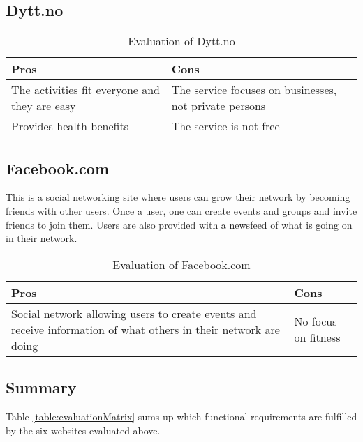 \subsection{Dytt.no}
\begin{table}[H]
\begin{center}
\begin{tabu} to 0.8\textwidth{ |X[l]|X[l]| } 
\hline {}
Pros & Cons \\
\hline
The activities fit everyone and they are easy &
The service focuses on businesses, not private persons \\ 
\hline
Provides health benefits & The service is not free \\ 
\hline
\end{tabu}
\end{center}
\caption{Evaluation of Dytt.no}
\end{table}

\subsection{Facebook.com}
This is a social networking site where users can grow their network by becoming friends with other users. Once a user, one can create events and groups and invite friends to join them. Users are also provided with a newsfeed of what is going on in their network. 
\begin{table}[H]
\begin{center}
\begin{tabu} to 0.8\textwidth{ |X[l]|X[l]| } 
\hline {}
Pros & Cons \\
\hline
Social network allowing users to create events and receive information of what others in their network are doing &
No focus on fitness \\ 
\hline
\end{tabu}
\end{center}
\caption{Evaluation of Facebook.com}
\end{table}

\subsection{Summary}
Table \ref{table:evaluationMatrix} sums up which functional requirements are fulfilled by the six websites evaluated above. 

